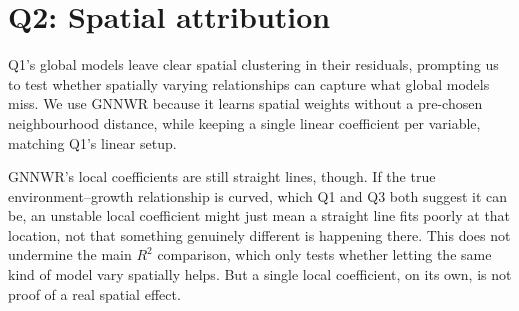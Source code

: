 \documentclass[logo,msc,ai]{infthesis}           %
\begin{document}

\section{Q2: Spatial attribution}

Q1's global models leave clear spatial clustering in their residuals, prompting us to test whether spatially varying relationships can capture what global models miss. We use GNNWR \cite{du2020Geographically_C6_GWR} because it learns spatial weights without a pre-chosen neighbourhood distance, while keeping a single linear coefficient per variable, matching Q1's linear setup.

GNNWR's local coefficients are still straight lines, though. If the true environment--growth relationship is curved, which Q1 and Q3 both suggest it can be, an unstable local coefficient might just mean a straight line fits poorly at that location, not that something genuinely different is happening there. This does not undermine the main $R^2$ comparison, which only tests whether letting the same kind of model vary spatially helps. But a single local coefficient, on its own, is not proof of a real spatial effect.
\end{document}
